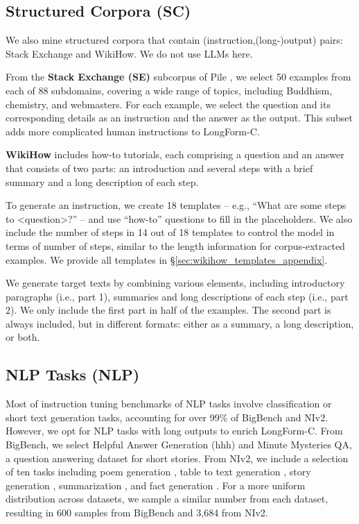 \subsection{Structured Corpora (SC)} We also mine structured corpora that contain (instruction,(long-)output) pairs: Stack Exchange and WikiHow. We do not use LLMs here.

From the
	\textbf{Stack Exchange (SE)} subcorpus of Pile \cite{gao2020pile}, we select 50 examples from each of 88 subdomains, covering a wide range of topics, including Buddhism, chemistry, and webmasters. For each example, we select the question and its corresponding details as an instruction and the answer as the output. This subset adds more complicated human instructions to LongForm-C.

\textbf{WikiHow} includes how-to tutorials, each comprising a question and an answer that consists of two parts: an introduction and several steps with a brief summary and a long description of each step.
\ignorespaces

To generate an instruction, we create 18 templates -- e.g., ``What are some steps to <question>?'' -- and use ``how-to'' questions to fill in the placeholders. We also include the number of steps in 14 out of 18 templates to control the model in terms of number of steps, similar to the length information for corpus-extracted examples. We provide all templates in \S\ref{sec:wikihow_templates_appendix}.

We generate target texts by combining various elements, including introductory paragraphs (i.e., part 1), summaries and long descriptions of each step (i.e., part 2). We only include the first part in half of the examples. The second part is always included, but in different formats: either as a summary, a long description, or both.

	\subsection{NLP Tasks (NLP)} Most of instruction tuning benchmarks of NLP tasks involve classification or short text generation tasks, accounting for over 99\% of BigBench and NIv2. However, we opt for NLP tasks with long outputs to enrich LongForm-C. From BigBench, we select Helpful Answer Generation (hhh) \cite{askell_2021_hhh_dataset} and Minute Mysteries QA, a question answering dataset for short stories. From NIv2, we include a selection of ten tasks including poem generation \cite{hipson-mohammad-2020-poki}, table to  text generation \cite{iyyer-etal-2017-search}, story generation \cite{sap-etal-2020-recollection,
	orbach-goldberg-2020-facts2story,
	lin-etal-2019-reasoning}, summarization \cite{fabbri-etal-2019-multi,
	kornilova-eidelman-2019-billsum,
	brazinskas-etal-2020-shot}, and fact generation \cite{kotonya-toni-2020-explainable-automated}. For a more uniform distribution across datasets, we sample a similar number from each dataset, resulting in 600 samples from BigBench and 3,684  from NIv2.


